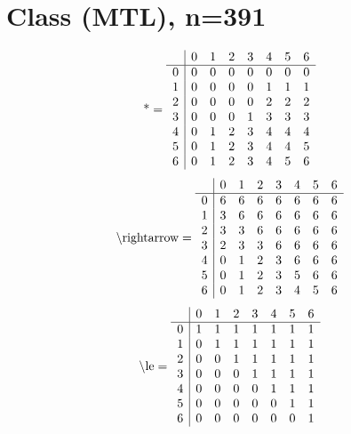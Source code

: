 \documentclass[11pt]{article}
\begin{document}
\section{Class (MTL), n=391}
\[\text{*} = 
\begin{array}{r | r r r r r r r}
 & 0 & 1 & 2 & 3 & 4 & 5 & 6 \\ \hline
0 & 0 & 0 & 0 & 0 & 0 & 0 & 0 \\
1 & 0 & 0 & 0 & 0 & 1 & 1 & 1 \\
2 & 0 & 0 & 0 & 0 & 2 & 2 & 2 \\
3 & 0 & 0 & 0 & 1 & 3 & 3 & 3 \\
4 & 0 & 1 & 2 & 3 & 4 & 4 & 4 \\
5 & 0 & 1 & 2 & 3 & 4 & 4 & 5 \\
6 & 0 & 1 & 2 & 3 & 4 & 5 & 6 \\
\end{array}
\]
\[\text{\textbackslash rightarrow} = 
\begin{array}{r | r r r r r r r}
 & 0 & 1 & 2 & 3 & 4 & 5 & 6 \\ \hline
0 & 6 & 6 & 6 & 6 & 6 & 6 & 6 \\
1 & 3 & 6 & 6 & 6 & 6 & 6 & 6 \\
2 & 3 & 3 & 6 & 6 & 6 & 6 & 6 \\
3 & 2 & 3 & 3 & 6 & 6 & 6 & 6 \\
4 & 0 & 1 & 2 & 3 & 6 & 6 & 6 \\
5 & 0 & 1 & 2 & 3 & 5 & 6 & 6 \\
6 & 0 & 1 & 2 & 3 & 4 & 5 & 6 \\
\end{array}
\]
\[\text{\textbackslash le} = 
\begin{array}{r | r r r r r r r}
 & 0 & 1 & 2 & 3 & 4 & 5 & 6 \\ \hline
0 & 1 & 1 & 1 & 1 & 1 & 1 & 1 \\
1 & 0 & 1 & 1 & 1 & 1 & 1 & 1 \\
2 & 0 & 0 & 1 & 1 & 1 & 1 & 1 \\
3 & 0 & 0 & 0 & 1 & 1 & 1 & 1 \\
4 & 0 & 0 & 0 & 0 & 1 & 1 & 1 \\
5 & 0 & 0 & 0 & 0 & 0 & 1 & 1 \\
6 & 0 & 0 & 0 & 0 & 0 & 0 & 1 \\
\end{array}
\]
\end{document}

